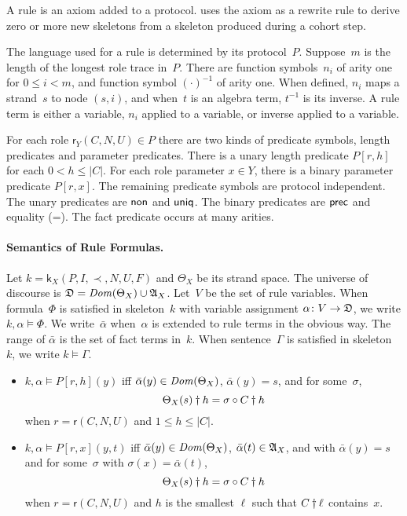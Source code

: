 \documentclass[12pt]{report}
\theoremstyle{definition}
\newcommand{\alga}{\alg{A}}
\newcommand{\sdom}{\fn{Dom}}
\newcommand{\role}{\mathsf{r}}
\newcommand{\skel}{\mathsf{k}}
\begin{document}
A rule is an axiom added to a protocol.  {\cpsa} uses the axiom as a
rewrite rule to derive zero or more new skeletons from a skeleton
produced during a cohort step.

The language used for a rule is determined by its protocol~$P$.
Suppose~$m$ is the length of the longest role trace in~$P$.  There are
function symbols~$n_i$ of arity one for $0\leq i<m$, and function
symbol $(\cdot)^{-1}$ of arity one.  When defined, $n_i$ maps a
strand~$s$ to node $(s,i)$, and when~$t$ is an algebra term, $t^{-1}$
is its inverse.  A rule term is either a variable, $n_i$ applied to a
variable, or inverse applied to a variable.

For each role $\role_Y(C,N,U)\in P$ there are two kinds of predicate
symbols, length predicates and parameter predicates.  There is a unary
length predicate $P[r,h]$ for each $0<h\leq|C|$.  For each role
parameter $x\in Y$, there is a binary parameter predicate $P[r,x]$.
The remaining predicate symbols are protocol independent.  The unary
predicates are $\operatorname{\mathsf{non}}$ and $\operatorname{\mathsf{uniq}}$.  The binary predicates are
$\operatorname{\mathsf{prec}}$ and equality (=).  The fact predicate occurs at many
arities.

\paragraph{Semantics of Rule Formulas.}

Let $k=\skel_X(P,I,\prec,N,U,F)$ and $\Theta_X$ be its strand space.
The universe of discourse is $\alg{D}=\sdom(\Theta_X)\cup\alga_X$.
Let~$V$ be the set of rule variables.  When formula~$\Phi$ is
satisfied in skeleton~$k$ with variable assignment $\alpha\colon V\to
\mathfrak D$, we write $k,\alpha\models\Phi$.  We write~$\bar\alpha$
when~$\alpha$ is extended to rule terms in the obvious way.  The range
of $\bar\alpha$ is the set of fact terms in~$k$.  When
sentence~$\Gamma$ is satisfied in skeleton~$k$, we write
$k\models\Gamma$.

\begin{itemize}
\item $k,\alpha\models P[r,h](y)$ iff $\bar\alpha(y)\in\sdom(\Theta_X)$,
  $\bar\alpha(y)=s$, and for some~$\sigma$,
  \[\Theta_X(s)\dagger h=\sigma\circ C\dagger h\]
  when $r=\role(C,N,U)$ and $1\leq h\leq|C|$.

\item $k,\alpha\models P[r,x](y,t)$ iff
  $\bar\alpha(y)\in\sdom(\Theta_X)$, $\bar\alpha(t)\in\alga_X$, and with
  $\bar\alpha(y)=s$ and for some~$\sigma$ with $\sigma(x)=\bar\alpha(t)$,
  \[\Theta_X(s)\dagger h=\sigma\circ C\dagger h\]
  when $r=\role(C,N,U)$ and $h$ is the smallest $\ell$ such that
  $C\dagger\ell$ contains~$x$.
\end{itemize}
\end{document}
